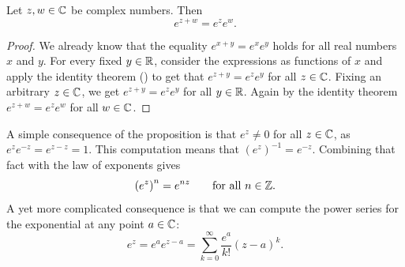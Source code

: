 \begin{myfigureht}
\caption{Graphs of the real part (left) and imaginary part (right)
of the complex exponential $e^z = e^{x+iy}$.  The $x$-axis goes from $-4$ to
$4$, the $y$-axis goes from $-6$ to $6$, and the vertical axis goes from
$-e^{4} \approx -54.6$
to
$e^{4} \approx 54.6$.  The plot of the real exponential ($y=0$)
is marked in a bold line.\label{fig:complexexpgraphs}}
\end{myfigureht}

\begin{prop}
Let $z,w \in {\mathbb{C}}$ be complex numbers.  Then
\begin{equation*}
e^{z+w} = e^z e^w.
\end{equation*}
\end{prop}

\begin{proof}
We already know that
the equality
$e^{x+y} = e^x e^y$ holds for all
real numbers $x$ and $y$.
For every fixed $y \in {\mathbb{R}}$, consider the expressions as
functions of $x$ and apply the identity theorem
() to get that
$e^{z+y} = e^ze^y$ for all $z \in {\mathbb{C}}$.  Fixing an arbitrary $z \in {\mathbb{C}}$,
we get
$e^{z+y} = e^ze^y$ for all $y \in {\mathbb{R}}$.  Again by the identity theorem 
$e^{z+w} = e^z e^w$
for all $w \in {\mathbb{C}}$.
\end{proof}

A simple consequence of the proposition is that $e^z \neq 0$ for all $z \in {\mathbb{C}}$,
as $e^z e^{-z} = e^{z-z} = 1$.
This computation means that ${(e^z)}^{-1} = e^{-z}$.
Combining that fact with the law of exponents gives
\begin{equation*}
{(e^z)}^{n} = e^{nz} \qquad \text{for all } n \in {\mathbb{Z}}.
\end{equation*}
A yet more complicated consequence is that we
can compute the power series for the exponential at any point $a \in
{\mathbb{C}}$:
\begin{equation*}
e^z = e^a e^{z-a} = \sum_{k=0}^\infty \frac{e^a}{k!} {(z-a)}^k .
\end{equation*}

